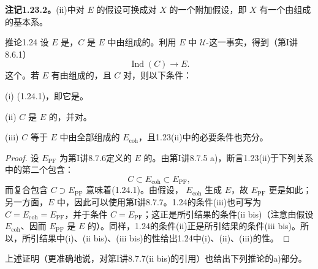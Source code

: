 \textbf{注记1.23.2。}(ii)中对 $E$ 的假设可换成对 $X$ 的一个附加假设，即 $X$ 有一个由组成的基本系。
\begin{SGAresult}{推论}{1.24}
设 $E$ 是，$C$ 是 $E$ 中由组成的。利用 $E$ 中 $\mathcal U$-这一事实，得到（第I讲8.6.1）
\[
\operatorname{Ind}(C)\longrightarrow E.\tag{1.24.1}
\]
这个。若 $E$ 有由组成的，且 $C$ 对，则以下条件：

(i) (1.24.1)，即它是。

(ii) $C$ 是 $E$ 的，并对。

(iii)  $C$ 等于 $E$ 中由全部组成的 $E_{\mathrm{coh}}$，且1.23(ii)中的必要条件也充分。
\end{SGAresult}
\begin{proof}
设 $E_{\mathrm{PF}}$ 为第I讲8.7.6定义的 $E$ 的。由第I讲8.7.5 a)，断言1.23(ii)于下列关系中的第二个包含：
\[
C\subset E_{\mathrm{coh}}\subset E_{\mathrm{PF}},
\]
而复合包含 $C\supset E_{\mathrm{PF}}$ 意味着(1.24.1)。由假设， $E_{\mathrm{coh}}$ 生成 $E$，故 $E_{\mathrm{PF}}$ 更是如此；另一方面，$E$ 中，因此可以使用第I讲8.7.7。1.24的条件(iii)也可写为 $C=E_{\mathrm{coh}}=E_{\mathrm{PF}}$，并于条件 $C=E_{\mathrm{PF}}$；这正是所引结果的条件(ii bis)（注意由假设 $E_{\mathrm{coh}}$、因而 $E_{\mathrm{PF}}$ 是 $E$ 的）。同样，1.24的条件(ii)正是所引结果的条件(iii bis)。所以，所引结果中(i)、(ii bis)、(iii bis)的性给出1.24中(i)、(ii)、(iii)的性。
\end{proof}
上述证明（更准确地说，对第I讲8.7.7(ii bis)的引用）也给出下列推论的a)部分。
